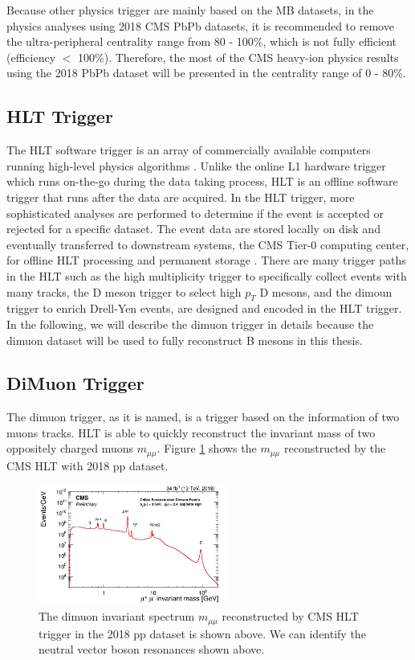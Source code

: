 Because other physics trigger are mainly based on the MB datasets, in the physics analyses using 2018 CMS PbPb datasets, it is recommended to remove the ultra-peripheral centrality range from 80 - 100\%, which is not fully efficient (efficiency $<$ 100\%). Therefore, the most of the CMS heavy-ion physics results using the 2018 PbPb dataset will be presented in the centrality range of 0 - 80\%.

\subsection{HLT Trigger}

The HLT software trigger is an array of commercially available computers running high-level physics algorithms \cite{CMSTrigger}. Unlike the online L1 hardware trigger which runs on-the-go during the data taking process, HLT is an offline software trigger that runs after the data are acquired. In the HLT trigger, more sophisticated analyses are performed to determine if the event is accepted or rejected for a specific dataset. The event data are stored locally on disk and eventually transferred to downstream systems, the CMS Tier-0 computing center, for offline HLT processing and permanent storage \cite{CMSTrigger}. There are many trigger paths in the HLT such as the high multiplicity trigger to specifically collect events with many tracks, the D meson trigger to select high $p_T$ D mesons, and the dimoun trigger to enrich Drell-Yen events, are designed and encoded in the HLT trigger. In the following, we will describe the dimuon trigger in details because the dimuon dataset will be used to fully reconstruct B mesons in this thesis. 

\subsection{DiMuon Trigger}

The dimuon trigger, as it is named, is a trigger based on the information of two muons tracks. HLT is able to quickly reconstruct the invariant mass of two oppositely charged muons $m_{\mu\mu}$. Figure \ref{DimuonInvMass} shows the $m_{\mu\mu}$ reconstructed by the CMS HLT with 2018 pp dataset.

\begin{figure}[hbtp]
\begin{center}
\includegraphics[width=0.55\textwidth]{Figures/Chapter2/DimuonInvMass.png}
\caption{The dimuon invariant spectrum $m_{\mu\mu}$ reconstructed by CMS HLT trigger in the 2018 pp dataset is shown above. We can identify the neutral vector boson resonances shown above.}
\label{DimuonInvMass}
\end{center}
\end{figure} 


